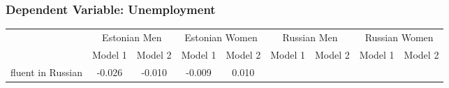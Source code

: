 \subsubsection{Dependent Variable: Unemployment}
\label{sec:unemployment_full}
\begin{sidewaystable}
	

\begin{tabular}{l*{2}{c}| *{2}{c}| *{2}{c}| *{2}{c}}
			\toprule
	& \multicolumn{2}{c|}{Estonian Men} & \multicolumn{2}{c|}{Estonian Women} & \multicolumn{2}{c|}{Russian Men} & \multicolumn{2}{c}{Russian Women} \\ 

	
	&\multicolumn{1}{c}{Model 1}&\multicolumn{1}{c|}{Model 2}&\multicolumn{1}{c}{Model 1}&\multicolumn{1}{c|}{Model 2}&\multicolumn{1}{c}{Model 1}&\multicolumn{1}{c|}{Model 2}&\multicolumn{1}{c}{Model 1}&\multicolumn{1}{c}{Model 2}\\
	\midrule
	fluent in Russian   &      -0.026\sym{***}&      -0.010         &      -0.009         &       0.010\sym{*}  &                     &                     &                     &                     \\


\end{tabular}
\end{sidewaystable}
